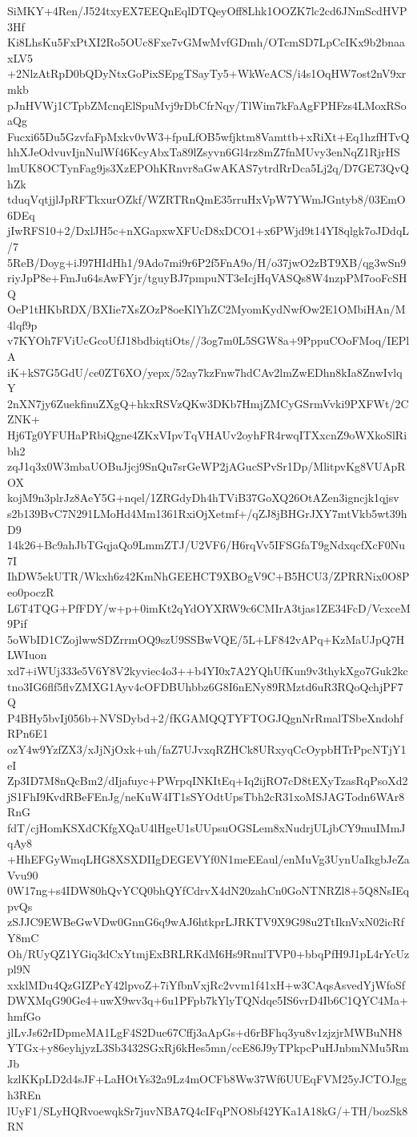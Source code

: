 SiMKY+4Ren/J524txyEX7EEQnEqlDTQeyOff8Lhk1OOZK7lc2cd6JNmScdHVP3Hf
Ki8LhsKu5FxPtXI2Ro5OUc8Fxe7vGMwMvfGDmh/OTcmSD7LpCcIKx9b2bnaaxLV5
+2NlzAtRpD0bQDyNtxGoPixSEpgTSayTy5+WkWeACS/i4s1OqHW7ost2nV9xrmkb
pJnHVWj1CTpbZMcnqElSpuMvj9rDbCfrNqy/TlWim7kFaAgFPHFzs4LMoxRSoaQg
Fucxi65Du5GzvfaFpMxkv0vW3+fpuLfOB5wfjktm8Vamttb+xRiXt+Eq1hzfHTvQ
hhXJeOdvuvIjnNulWf46KcyAbxTa89lZsyvn6Gl4rz8mZ7fnMUvy3enNqZ1RjrHS
lmUK8OCTynFag9js3XzEPOhKRnvr8aGwAKAS7ytrdRrDca5Lj2q/D7GE73QvQhZk
tduqVqtjjlJpRFTkxurOZkf/WZRTRnQmE35rruHxVpW7YWmJGntyb8/03EmO6DEq
jIwRFS10+2/DxlJH5c+nXGapxwXFUcD8xDCO1+x6PWjd9t14YI8qlgk7oJDdqL/7
5ReB/Doyg+iJ97HIdHh1/9Ado7mi9r6P2f5FnA9o/H/o37jwO2zBT9XB/qg3wSn9
riyJpP8e+FmJu64sAwFYjr/tguyBJ7pmpuNT3eIcjHqVASQs8W4nzpPM7ooFcSHQ
OeP1tHKbRDX/BXIie7XsZOzP8oeKlYhZC2MyomKydNwfOw2E1OMbiHAn/M4lqf9p
v7KYOh7FViUcGcoUfJ18bdbiqtiOts//3og7m0L5SGW8a+9PppuCOoFMoq/IEPlA
iK+kS7G5GdU/ce0ZT6XO/yepx/52ay7kzFnw7hdCAv2lmZwEDhn8kIa8ZnwIvlqY
2nXN7jy6ZuekfinuZXgQ+hkxRSVzQKw3DKb7HmjZMCyGSrmVvki9PXFWt/2CZNK+
Hj6Tg0YFUHaPRbiQgne4ZKxVIpvTqVHAUv2oyhFR4rwqITXxcnZ9oWXkoSlRibh2
zqJ1q3x0W3mbaUOBuJjcj9SnQu7srGeWP2jAGucSPvSr1Dp/MlitpvKg8VUApROX
kojM9n3plrJz8AeY5G+nqel/1ZRGdyDh4hTViB37GoXQ26OtAZen3igncjk1qjsv
s2b139BvC7N291LMoHd4Mm1361RxiOjXetmf+/qZJ8jBHGrJXY7mtVkb5wt39hD9
14k26+Bc9ahJbTGqjaQo9LmmZTJ/U2VF6/H6rqVv5IFSGfaT9gNdxqcfXcF0Nu7I
IhDW5ekUTR/Wkxh6z42KmNhGEEHCT9XBOgV9C+B5HCU3/ZPRRNix0O8Peo0poczR
L6T4TQG+PfFDY/w+p+0imKt2qYdOYXRW9c6CMIrA3tjas1ZE34FcD/VcxceM9Pif
5oWbID1CZojlwwSDZrrmOQ9szU9SSBwVQE/5L+LF842vAPq+KzMaUJpQ7HLWIuon
xd7+iWUj333e5V6Y8V2kyviec4o3++b4YI0x7A2YQhUfKun9v3thykXgo7Guk2kc
tno3IG6flf5flvZMXG1Ayv4cOFDBUhbbz6G8I6nENy89RMztd6uR3RQoQchjPF7Q
P4BHy5bvIj056b+NVSDybd+2/fKGAMQQTYFTOGJQgnNrRmalTSbeXndohfRPn6E1
ozY4w9YzfZX3/xJjNjOxk+uh/faZ7UJvxqRZHCk8URxyqCcOypbHTrPpcNTjY1eI
Zp3ID7M8nQcBm2/dIjafuyc+PWrpqINKItEq+Iq2ijRO7cD8tEXyTzasRqPsoXd2
jS1FhI9KvdRBeFEnJg/neKuW4IT1sSYOdtUpsTbh2cR31xoMSJAGTodn6WAr8RnG
fdT/cjHomKSXdCKfgXQaU4lHgeU1sUUpsuOGSLem8xNudrjULjbCY9muIMmJqAy8
+HhEFGyWmqLHG8XSXDIIgDEGEVYf0N1meEEaul/enMuVg3UynUaIkgbJeZaVvu90
0W17ng+s4IDW80hQvYCQ0bhQYfCdrvX4dN20zahCn0GoNTNRZl8+5Q8NsIEqpvQs
zSJJC9EWBeGwVDw0GnnG6q9wAJ6htkprLJRKTV9X9G98u2TtIknVxN02icRfY8mC
Oh/RUyQZ1YGiq3dCxYtmjExBRLRKdM6Hs9RnulTVP0+bbqPfH9J1pL4rYcUzpl9N
xxklMDu4QzGIZPcY42lpvoZ+7iYfbnVxjRc2vvm1f41xH+w3CAqsAsvedYjWfoSf
DWXMqG90Ge4+uwX9wv3q+6u1PFpb7kYlyTQNdqe5IS6vrD4Ib6C1QYC4Ma+hmfGo
jlLvJs62rIDpmeMA1LgF4S2Due67Cffj3aApGs+d6rBFhq3yu8v1zjzjrMWBuNH8
YTGx+y86eyhjyzL3Sb3432SGxRj6kHes5mn/ccE86J9yTPkpcPuHJnbmNMu5RmJb
kzlKKpLD2d4sJF+LaHOtYs32a9Lz4mOCFb8Ww37Wf6UUEqFVM25yJCTOJggh3REn
lUyF1/SLyHQRvoewqkSr7juvNBA7Q4cIFqPNO8bf42YKa1A18kG/+TH/bozSk8RN
